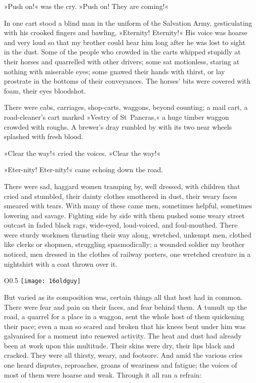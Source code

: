 »Push on!« was the cry. »Push on! They are coming!«



In one cart stood a blind man in the uniform of the Salvation Army, gesticulating with his crooked fingers and bawling, »Eternity! Eternity!« His voice was hoarse and very loud so that my brother could hear him long after he was lost to sight in the dust. Some of the people who crowded in the carts whipped stupidly at their horses and quarrelled with other drivers; some sat motionless, staring at nothing with miserable eyes; some gnawed their hands with thirst, or lay prostrate in the bottoms of their conveyances. The horses' bits were covered with foam, their eyes bloodshot.

There were cabs, carriages, shop-carts, waggons, beyond counting; a mail cart, a road-cleaner's cart marked »Vestry of St~Pancras,« a huge timber waggon crowded with roughs. A brewer's dray rumbled by with its two near wheels splashed with fresh blood.

»Clear the way!« cried the voices. »Clear the way!«

»Eter-nity! Eter-nity!« came echoing down the road.

There were sad, haggard women tramping by, well dressed, with children that cried and stumbled, their dainty clothes smothered in dust, their weary faces smeared with tears. With many of these came men, sometimes helpful, sometimes lowering and savage. Fighting side by side with them pushed some weary street outcast in faded black rags, wide-eyed, loud-voiced, and foul-mouthed. There were sturdy workmen thrusting their way along, wretched, unkempt men, clothed like clerks or shopmen, struggling spasmodically; a wounded soldier my brother noticed, men dressed in the clothes of railway porters, one wretched creature in a nightshirt with a coat thrown over it.

\begin{wrapfigure}{O}{0.5\textwidth}
\centering
\texttt{[image: 16oldguy]}
\end{wrapfigure}

But varied as its composition was, certain things all that host had in common. There were fear and pain on their faces, and fear behind them. A tumult up the road, a quarrel for a place in a waggon, sent the whole host of them quickening their pace; even a man so scared and broken that his knees bent under him was galvanised for a moment into renewed activity. The heat and dust had already been at work upon this multitude. Their skins were dry, their lips black and cracked. They were all thirsty, weary, and footsore. And amid the various cries one heard disputes, reproaches, groans of weariness and fatigue; the voices of most of them were hoarse and weak. Through it all ran a refrain:

